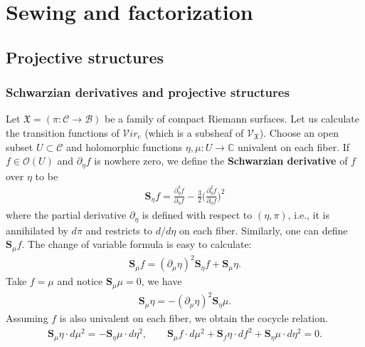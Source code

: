 \documentclass[12pt,a4paper,notitlepage]{report}
\theoremstyle{definition}
\theoremstyle{plain}
\newcommand{\fk}{\mathfrak}
\newcommand{\mc}{\mathcal}
\newcommand{\scr}{\mathscr}
\newcommand{\Cbb}{\mathbb C}
\newcommand{\svir}{\mathcal V\!\mathit{ir}}
\newcommand{\Sbf}{\mathbf{S}}
\numberwithin{equation}{section}
\begin{document}
\chapter{Sewing and factorization}





\section{Projective structures}




\subsection*{Schwarzian derivatives and projective structures}
Let $\fk X=(\pi:\mc C\rightarrow\mc B)$ be a family of compact Riemann surfaces. Let us calculate the transition functions of $\svir_c$ (which is a subsheaf of $\scr V_{\fk X}$). Choose an open subset $U\subset \mc C$ and holomorphic functions $\eta,\mu:U\rightarrow\Cbb$ univalent on each fiber. If $f\in\scr O(U)$ and $\partial_\eta f$ is nowhere zero, we define the \textbf{Schwarzian derivative} of $f$ over $\eta$ to be \index{S@$\Sbf_\eta f,\Sbf_\eta\fk P$}
\begin{align}
\Sbf_\eta f=\frac{\partial_\eta^3f}{\partial_\eta f}-\frac 32 \Big(\frac{\partial_\eta^2f}{\partial_\eta f} \Big)^2
\end{align}
where the partial derivative $\partial_\eta$ is defined with respect to $(\eta,\pi)$, i.e., it is annihilated by $d\pi$ and restricts to $d/d\eta$ on each fiber. Similarly, one can define $\Sbf_\mu f$. The change of variable formula is easy to calculate:
\begin{align}\label{eq166}
\Sbf_\mu f =(\partial_\mu\eta)^2 \Sbf_\eta f+\Sbf_\mu\eta.
\end{align}
Take $f=\mu$ and notice $\Sbf_\mu\mu=0$, we have
\begin{align}
\Sbf_\mu\eta=-(\partial_\mu\eta)^2\Sbf_\eta\mu.\label{eq167}
\end{align}
Assuming $f$ is also univalent on each fiber, we obtain the cocycle relation.
\begin{align}
\Sbf_\mu\eta\cdot d\mu^2=-\Sbf_\eta\mu\cdot d\eta^2,\qquad \Sbf_\mu f\cdot d\mu^2 + \Sbf_f \eta\cdot df^2+\Sbf_\eta\mu\cdot d\eta^2=0.\label{eq260}
\end{align}
\end{document}
